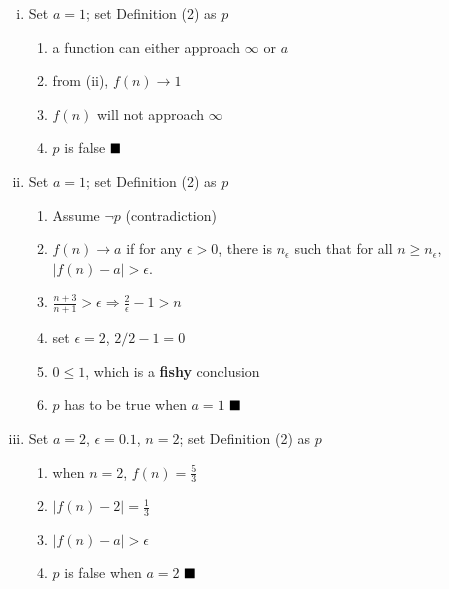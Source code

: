 \documentclass{article}
\def\math#1{$#1$}
\begin{document}
\begin{enumerate}[i)]
    \item Set \math{a = 1}; set Definition (2) as \math{p}
        \begin{enumerate}[(1)]
            \item a function can either approach \math{\infty} or \math{a}
            \item from (ii), \math{f(n) \to 1}
            \item \math{f(n)} will not approach \math{\infty}
            \item \math{p} is false 
            \math{\hfill{\blacksquare}}
        \end{enumerate}
    \item Set \math{a = 1}; set Definition (2) as \math{p}
        \begin{enumerate}[(1)]
            \item Assume \math{\neg p} (contradiction)
            \item \math{f(n) \to a} if for any \math{\epsilon > 0}, there is \math{n_{\epsilon}} such that for all \math{n \geq n_{\epsilon}}, \math{|f(n) - a| > \epsilon}.
            \item \math{\frac{n+3}{n+1} > \epsilon \Rightarrow \frac{2}{\epsilon} - 1 > n}
            \item set \math{\epsilon = 2}, \math{2/2 - 1 = 0}
            \item \math{0 \leq 1}, which is a \textbf{fishy} conclusion
            \item \math{p} has to be true when \math{a = 1}
            \math{\hfill{\blacksquare}}
        \end{enumerate}
    \item Set \math{a = 2}, \math{\epsilon = 0.1}, \math{n = 2}; set Definition (2) as \math{p}
        \begin{enumerate}[(1)]
            \item when \math{n = 2}, \math{f(n) = \frac{5}{3}}
            \item \math{|f(n) - 2| = \frac{1}{3}}
            \item \math{|f(n) - a| > \epsilon} 
            \item \math{p} is false when \math{a = 2} 
            \math{\hfill{\blacksquare}}
        \end{enumerate} 
\end{enumerate}
\end{document}
